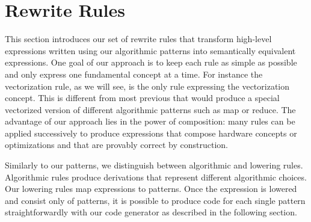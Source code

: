 \section{Rewrite Rules}
\label{section:rules}

This section introduces our set of rewrite rules that transform high-level expressions written using our algorithmic patterns into semantically equivalent expressions.
One goal of our approach is to keep each rule as simple as possible and only express one fundamental concept at a time.
For instance the vectorization rule, as we will see, is the only rule expressing the vectorization concept.
This is different from most previous  that would produce a special vectorized version of different algorithmic patterns such as map or reduce.
The advantage of our approach lies in the power of composition:
many rules can be applied successively to produce expressions that compose hardware concepts or optimizations and that are provably correct by construction.

Similarly to our patterns, we distinguish between algorithmic and lowering rules.
Algorithmic rules produce derivations that represent different algorithmic choices.
Our lowering rules map expressions to \OpenCL patterns.
Once the expression is lowered and consist only of \OpenCL patterns, it is possible to produce \OpenCL code for each single pattern straightforwardly with our code generator as described in the following section.





